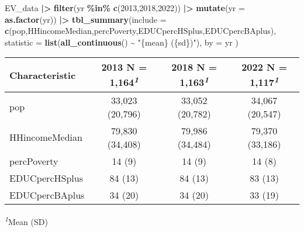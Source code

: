 \documentclass[
]{article}
\newenvironment{Shaded}{\begin{snugshade}}{\end{snugshade}}
\newcommand{\AttributeTok}[1]{\textcolor[rgb]{0.13,0.29,0.53}{#1}}
\newcommand{\DecValTok}[1]{\textcolor[rgb]{0.00,0.00,0.81}{#1}}
\newcommand{\FunctionTok}[1]{\textcolor[rgb]{0.13,0.29,0.53}{\textbf{#1}}}
\newcommand{\NormalTok}[1]{#1}
\newcommand{\SpecialCharTok}[1]{\textcolor[rgb]{0.81,0.36,0.00}{\textbf{#1}}}
\newcommand{\StringTok}[1]{\textcolor[rgb]{0.31,0.60,0.02}{#1}}
\begin{document}
\begin{Shaded}
\begin{Highlighting}[]
\NormalTok{EV\_data }\SpecialCharTok{|\textgreater{}} \FunctionTok{filter}\NormalTok{(yr }\SpecialCharTok{\%in\%} \FunctionTok{c}\NormalTok{(}\DecValTok{2013}\NormalTok{,}\DecValTok{2018}\NormalTok{,}\DecValTok{2022}\NormalTok{)) }\SpecialCharTok{|\textgreater{}} 
        \FunctionTok{mutate}\NormalTok{(}\AttributeTok{yr =} \FunctionTok{as.factor}\NormalTok{(yr)) }\SpecialCharTok{|\textgreater{}}
        \FunctionTok{tbl\_summary}\NormalTok{(}\AttributeTok{include =} \FunctionTok{c}\NormalTok{(pop,HHincomeMedian,percPoverty,EDUCpercHSplus,EDUCpercBAplus),}
                       \AttributeTok{statistic =} \FunctionTok{list}\NormalTok{(}\FunctionTok{all\_continuous}\NormalTok{() }\SpecialCharTok{\textasciitilde{}} \StringTok{"\{mean\} (\{sd\})"}\NormalTok{),}
                    \AttributeTok{by =}\NormalTok{ yr )}
\end{Highlighting}
\end{Shaded}

\begin{table}[t]
\fontsize{12.0pt}{14.4pt}\selectfont
\begin{tabular*}{\linewidth}{@{\extracolsep{\fill}}lccc}
\toprule
\textbf{Characteristic} & \textbf{2013}  N = 1,164\textsuperscript{\textit{1}} & \textbf{2018}  N = 1,163\textsuperscript{\textit{1}} & \textbf{2022}  N = 1,117\textsuperscript{\textit{1}} \\ 
\midrule\addlinespace[2.5pt]
pop & 33,023 (20,796) & 33,052 (20,782) & 34,067 (20,547) \\ 
HHincomeMedian & 79,830 (34,408) & 79,986 (34,484) & 79,370 (33,186) \\ 
percPoverty & 14 (9) & 14 (9) & 14 (8) \\ 
EDUCpercHSplus & 84 (13) & 84 (13) & 83 (13) \\ 
EDUCpercBAplus & 34 (20) & 34 (20) & 33 (19) \\ 
\bottomrule
\end{tabular*}
\begin{minipage}{\linewidth}
\textsuperscript{\textit{1}}Mean (SD)\\
\end{minipage}
\end{table}
\end{document}
